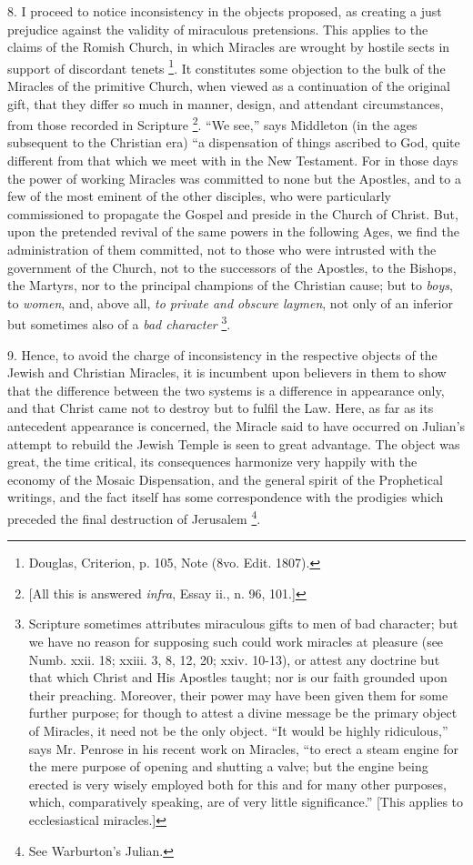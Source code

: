 8. I proceed to notice inconsistency in the
objects proposed, as creating a just prejudice against the validity of
miraculous pretensions. This applies to the claims of the Romish
Church, in which Miracles are wrought by hostile sects in support of
discordant tenets \footnote{Douglas, Criterion, p. 105, Note (8vo. Edit.
1807).}. It constitutes some objection to the bulk
of the Miracles of the primitive Church, when viewed as a continuation
of the original gift, that they differ so much in manner, design, and
attendant circumstances, from those recorded in Scripture \footnote{[All this is answered \emph{infra}, Essay
ii., n. 96, 101.]}. ``We see,'' says Middleton (in the ages subsequent to the Christian
era) ``a dispensation of things ascribed to God, quite different from
that which we meet with in the New Testament. For in those days the
power of working Miracles was committed to none but the Apostles, and
to a few of the most eminent of the other disciples, who were
particularly commissioned to propagate the Gospel and preside in the
Church of Christ. But, upon the pretended revival of the same powers
in the following Ages, we find the administration of them committed,
not to those who were intrusted with the government of the Church, not
to the successors of the Apostles, to the Bishops, the Martyrs,
nor to the principal champions of the Christian cause; but to \emph{boys},
to \emph{women}, and, above all, \emph{to private and obscure laymen},
not only of an inferior but sometimes also of a \emph{bad character}
\footnote{Scripture sometimes attributes miraculous
gifts to men of bad character; but we have no reason for supposing
such could work miracles at pleasure (see Numb. xxii. 18; xxiii. 3, 8,
12, 20; xxiv. 10-13), or attest any doctrine but that which Christ and
His Apostles taught; nor is our faith grounded upon their preaching.
Moreover, their power may have been given them for some further
purpose; for though to attest a divine message be the primary object
of Miracles, it need not be the only object. ``It would be highly
ridiculous,'' says Mr. Penrose in his recent work on Miracles, ``to
erect a steam engine for the mere purpose of opening and shutting a
valve; but the engine being erected is very wisely employed both for
this and for many other purposes, which, comparatively speaking, are
of very little significance.'' [This applies to ecclesiastical
miracles.]}.

9. Hence, to avoid the charge of inconsistency in
the respective objects of the Jewish and Christian Miracles, it is
incumbent upon believers in them to show that the difference between
the two systems is a difference in appearance only, and that Christ
came not to destroy but to fulfil the Law. Here, as far as its
antecedent appearance is concerned, the Miracle said to have occurred
on Julian's attempt to rebuild the Jewish Temple is seen to great
advantage. The object was great, the time critical, its consequences
harmonize very happily with the economy of the Mosaic Dispensation,
and the general spirit of the Prophetical writings, and the fact
itself has some correspondence with the prodigies which preceded the
final destruction of Jerusalem \footnote{See Warburton's Julian.}.

